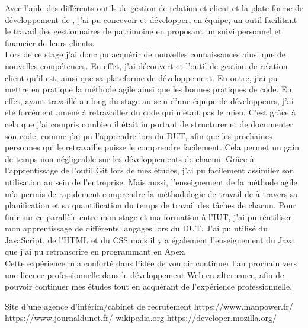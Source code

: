 \documentclass[12pt,oneside,noprintercorrection]{iut}
\begin{document}
Avec l'aide des différents outils de gestion de relation et client et la plate-forme de développement de \slf{}, j'ai pu concevoir et développer, en équipe, un outil facilitant le travail des gestionnaires de patrimoine en proposant un suivi personnel et financier de leurs clients.
~\\\indent Lors de ce stage j'ai donc pu acquérir de nouvelles connaissances ainsi que de nouvelles compétences. En effet, j'ai découvert \slf{} et l'outil de gestion de relation client qu'il est, ainsi que sa plateforme de développement. En outre, j'ai pu mettre en pratique la méthode agile ainsi que les bonnes pratiques de code. En effet, ayant travaillé au long du stage au sein d'une équipe de développeurs, j'ai été forcément amené à retravailler du code qui n'était pas le mien. C'est grâce à cela que j'ai compris combien il était important de structurer et de documenter son code, comme j'ai pu l'apprendre lors du DUT, afin que les prochaines personnes qui le retravaille puisse le comprendre facilement. Cela permet un gain de temps non négligeable sur les développements de chacun. Grâce à l'apprentissage de l'outil Git lors de mes études, j'ai pu facilement assimiler son utilisation au sein de l'entreprise. Mais aussi, l'enseignement de la méthode agile m'a permis de rapidement comprendre la méthodologie de travail de \gz{} à travers sa planification et sa quantification du temps de travail des tâches de chacun. Pour finir sur ce parallèle entre mon stage et ma formation à l'IUT, j'ai pu réutiliser mon apprentissage de différents langages lors du DUT. J'ai pu utilisé du JavaScript, de l'HTML et du CSS mais il y a également l'enseignement du Java que j'ai pu retranscrire en programmant en Apex.
~\\\indent Cette expérience m'a conforté dans l'idée de vouloir continuer l'an prochain vers une licence professionnelle dans le développement Web en alternance, afin de pouvoir continuer mes études tout en acquérant de l'expérience professionnelle. 


\small

Site d'une agence d'intérim/cabinet de recrutement https://www.manpower.fr/ \newline
https://www.journaldunet.fr/ \newline
wikipedia.org \newline
https://developer.mozilla.org/
\end{document}
